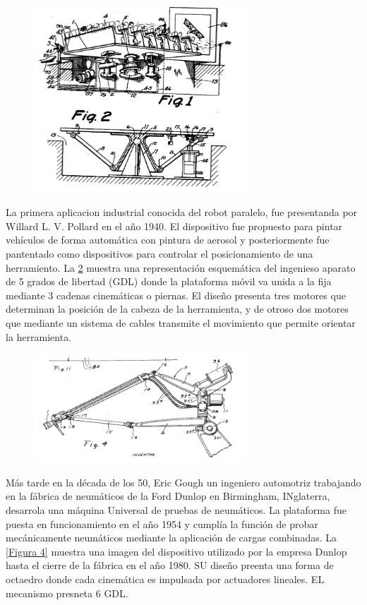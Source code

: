 \documentclass[letter,openrigh,12pt,spanish]{report}
\begin{document}
\begin{figure}[htp]
\centering
\includegraphics[width=8cm]{fi2.png}
\caption{}
\label{Figura 1}
\end{figure}

La primera aplicacion industrial conocida del robot paralelo, fue presentanda por Willard L. V. Pollard en el año 1940. El dispositivo fue propuesto para pintar veh\'iculos de forma autom\'atica con pintura de aerosol y posteriormente fue pantentado como dispositivos para controlar el posicionamiento de una herramiento. La \ref{Figura 2} muestra una representaci\'on esquem\'atica del ingenieso aparato de 5 grados de libertad (GDL) donde la plataforma m\'ovil va unida a la fija mediante 3 cadenas cinem\'aticas o piernas. El dise\~no presenta tres motores que determinan la posici\'on de la cabeza de la herramienta, y de otroso dos motores que mediante un sistema de cables transmite el movimiento que permite orientar la herramienta.

\begin{figure}[htp]
\centering
\includegraphics[width=8cm]{fi1.png}
\caption{}
\label{Figura 2}
\end{figure}

M\'as tarde en la d\'ecada de los 50, Eric Gough un ingeniero automotriz trabajando en la f\'abrica de neum\'aticos de la Ford Dunlop en Birmingham, INglaterra, desarrola una m\'aquina Universal de pruebas de neum\'aticos. La plataforma fue puesta en funcionamiento en el a\~no 1954 y cumpl\'ia la funci\'on de probar mec\'anicamente neum\'aticos mediante la aplicaci\'on de cargas combinadas. La \ref{Figura 4} muestra una imagen del dispositivo utilizado por la empresa Dunlop hasta el cierre de la f\'abrica en el a\~no 1980. SU dise\~no preenta una forma de octaedro donde cada cinem\'atica es impulsada por actuadores lineales. EL mecanismo presneta 6 GDL.
\end{document}
